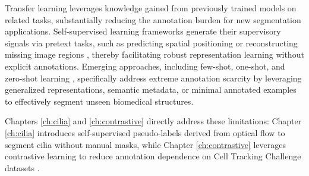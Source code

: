 \documentclass[./dissertation.tex]{subfiles}
\begin{document}
Transfer learning leverages knowledge gained from previously trained models on related tasks, substantially reducing the annotation burden for new segmentation applications. Self-supervised learning frameworks generate their supervisory signals via pretext tasks, such as predicting spatial positioning or reconstructing missing image regions \cite{chen2020simple}, thereby facilitating robust representation learning without explicit annotations. Emerging approaches, including few-shot, one-shot, and zero-shot learning \cite{zhao2023one}, specifically address extreme annotation scarcity by leveraging generalized representations, semantic metadata, or minimal annotated examples to effectively segment unseen biomedical structures.

Chapters \ref{ch:cilia} and \ref{ch:contrastive} directly address these limitations: Chapter \ref{ch:cilia} introduces self-supervised pseudo-labels derived from optical flow to segment cilia without manual masks, while Chapter \ref{ch:contrastive} leverages contrastive learning to reduce annotation dependence on Cell Tracking Challenge datasets \cite{mavska2023cell}.

\end{document}
